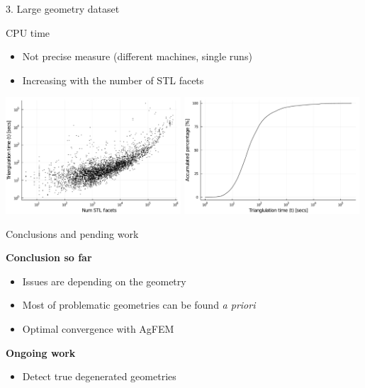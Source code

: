 \documentclass{beamer}
\begin{document}
\begin{frame}{3. Large geometry dataset}

  \begin{block}{CPU time}
  \begin{itemize}
    \item
      Not precise measure (different machines, single runs)
    \item
      Increasing with the number of STL facets
  \end{itemize}
  \end{block}

  \includegraphics[width=0.49\textwidth]{../analysis/plots/num_stl_facets_time}
  \includegraphics[width=0.49\textwidth]{../analysis/plots/histogram_time}
\end{frame}

\begin{frame}{Conclusions and pending work}

  \textbf{Conclusion so far}
  \begin{itemize}
    \item
      Issues are depending on the geometry
    \item
      Most of problematic geometries can be found \textit{a priori}
    \item
      Optimal convergence with AgFEM
  \end{itemize}
  \textbf{Ongoing work}
  \begin{itemize}
    \item
      Detect true degenerated geometries
  \end{itemize}


\end{frame}
\end{document}
